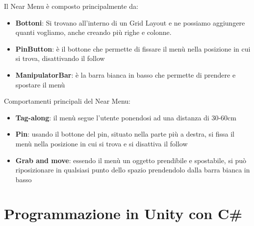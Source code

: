 Il Near Menu è composto principalmente da:
\begin{itemize}
    \item \textbf{Bottoni}: Si trovano all'interno di un Grid Layout e ne possiamo aggiungere quanti vogliamo, anche creando più righe e colonne.
    \item \textbf{PinButton}: è il bottone che permette di fissare il menù nella posizione in cui si trova, disattivando il follow
    \item \textbf{ManipulatorBar}: è la barra bianca in basso che permette di prendere e spostare il menù
\end{itemize}

Comportamenti principali del Near Menu:
\begin{itemize}
    \item \textbf{Tag-along}: il menù segue l'utente ponendosi ad una distanza di 30-60cm 
    \item \textbf{Pin}: usando il bottone del pin, situato nella parte più a destra, si fissa il menù nella posizione in cui si trova e si disattiva il follow
    \item \textbf{Grab and move}: essendo il menù un oggetto prendibile e spostabile, si può riposizionare in qualsiasi punto dello spazio prendendolo dalla barra bianca in basso
\end{itemize}

\cite{MRTKnearMenu}

\section{Programmazione in Unity con C\#}
